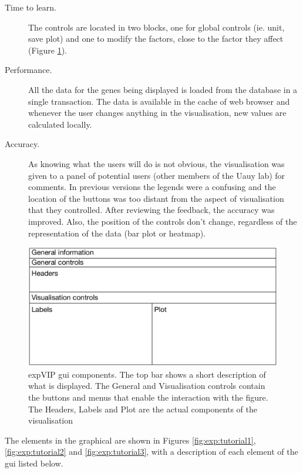 \begin{description}
\item[Time to learn.] The controls are located in two blocks, one for global controls (ie. unit, save plot) and one to modify the factors, close to the factor they affect (Figure \ref{fig:exp:layout}). 
\item[Performance.] All the data for the genes being displayed is loaded from the database in a single transaction. The data is available in the cache of web browser and whenever the user changes anything in the visualisation, new values are calculated locally. 
\item[Accuracy.] As knowing what the users will do is not obvious, the visualisation was given to a panel of potential users (other members of the Uauy lab) for comments. In previous versions the legends were a confusing and the location of the buttons was too distant from the aspect of visualisation that they controlled. After reviewing the feedback, the accuracy was improved.  Also, the position of the controls don't change, regardless of the representation of the data (bar plot or heatmap). 
\end{description}

\begin{figure}
\includegraphics[width=1\textwidth]{expVIP/Figures/UIsketch.pdf}
\caption[\gls{expvip} \gls{gui} layout]{expVIP \acrlong{gui} components. The top bar shows a short description of what is displayed. The General and Visualisation controls contain the buttons and menus that enable the interaction with the figure. The Headers, Labels and Plot are the actual components of the visualisation}
\label{fig:exp:layout}
\end{figure}

The elements in the graphical are shown in Figures \ref{fig:exp:tutorial1}, \ref{fig:exp:tutorial2} and \ref{fig:exp:tutorial3}, with a description of each element of the \acrshort{gui} listed below. 

